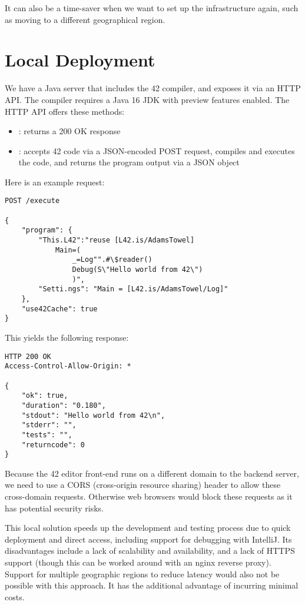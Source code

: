 It can also be a time-saver when we want to set up the infrastructure again, such as moving to a different geographical region.

\section{Local Deployment}

We have a Java server that includes the 42 compiler, and exposes it via an HTTP API. The compiler requires a Java 16 JDK with preview features enabled. The HTTP API offers these methods:

\begin{itemize}
\item {}: returns a 200 OK response
\item {}: accepts 42 code via a JSON-encoded POST request, compiles and executes the code, and returns the program output via a JSON object
\end{itemize}

Here is an example request:
\begin{lstlisting}[caption=42 API Request]
POST /execute

{
    "program": {
        "This.L42":"reuse [L42.is/AdamsTowel]
            Main=(
                _=Log"".#\$reader()
                Debug(S\"Hello world from 42\")
                )",
        "Setti.ngs": "Main = [L42.is/AdamsTowel/Log]"
    },
    "use42Cache": true
}
\end{lstlisting}

This yields the following response:
\begin{lstlisting}[caption=42 API Response]
HTTP 200 OK
Access-Control-Allow-Origin: *

{
    "ok": true,
    "duration": "0.180",
    "stdout": "Hello world from 42\n",
    "stderr": "",
    "tests": "",
    "returncode": 0
}
\end{lstlisting}

Because the 42 editor front-end runs on a different domain to the backend server, we need to use a CORS (cross-origin resource sharing) header to allow these cross-domain requests. Otherwise web browsers would block these requests as it has potential security risks.

This local solution speeds up the development and testing process due to quick deployment and direct access, including support for debugging with IntelliJ. Its disadvantages include a lack of scalability and availability, and a lack of HTTPS support (though this can be worked around with an nginx reverse proxy). Support for multiple geographic regions to reduce latency would also not be possible with this approach. It has the additional advantage of incurring minimal costs.

